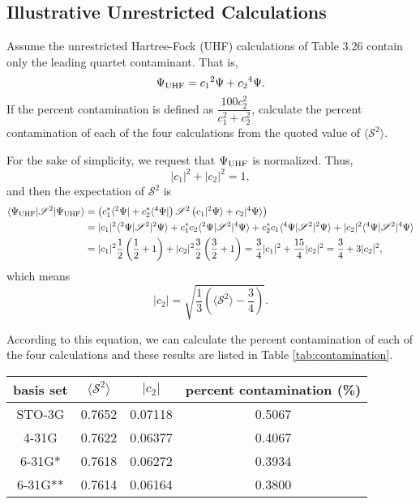 \documentclass[a4paper]{book}
\newcounter{exercise}[chapter]
\newcounter{solution}[chapter]
\newcommand\Tableref[1]{Table \ref{#1}}
\begin{document}
	\subsection{Illustrative Unrestricted Calculations}
	
	\begin{exercise}
	Assume the unrestricted Hartree-Fock (UHF) calculations of Table 3.26 contain only the leading quartet contaminant. That is,
	\[
	 	\Psi_{\rm UHF} = c_1 {}^{2} \Psi + c_2 {}^{4} \Psi .
	\]
	If the percent contamination is defined as $\dfrac{ 100 c^2_2 }{ c^2_1 + c^2_2 }$, calculate the percent contamination of each of the four calculations from the quoted value of $\langle \mathscr{S}^2 \rangle$.
	\end{exercise}
	
	\begin{solution}
	
	For the sake of simplicity, we request that $\Psi_{\rm UHF}$ is normalized. Thus,
	\[
		| c_1 |^2 + | c_2 |^2 = 1 ,
	\]
	and then the expectation of $\mathscr{S}^2$ is
	\begin{align*}
		\langle \Psi_{\rm UHF} | \mathscr{S}^2 | \Psi_{\rm UHF} \rangle &= \left( c^*_1 \langle {}^{2} \Psi | + c^*_2 \langle {}^{4} \Psi | \right) \mathscr{S}^2 \left( c_1 | {}^{2} \Psi \rangle + c_2 | {}^{4} \Psi \rangle \right) \\
		&= | c_1 |^2 \langle {}^{2} \Psi | \mathscr{S}^2 | {}^{2} \Psi \rangle + c^*_1 c_2 \langle {}^{2} \Psi | \mathscr{S}^2 | {}^{4} \Psi \rangle + c^*_2 c_1 \langle {}^{4} \Psi | \mathscr{S}^2 | {}^{2} \Psi \rangle + | c_2 |^2 \langle {}^{4} \Psi | \mathscr{S}^2 | {}^{4} \Psi \rangle \\
		&= | c_1 |^2 \frac{1}{2} \left( \frac{1}{2} + 1 \right) + | c_2 |^2 \frac{3}{2} \left( \frac{3}{2} + 1 \right) = \frac{3}{4} | c_1 |^2 + \frac{15}{4} | c_2 |^2 = \frac{3}{4} + 3 | c_2 |^2 ,
	\end{align*}
	which means
	\[
		| c_2 | =  \sqrt{ \frac{1}{3} \left( \langle \mathscr{S}^2 \rangle - \frac{3}{4} \right) } .
	\]
	
	According to this equation, we can calculate the percent contamination of each of the four calculations and these results are listed in \Tableref{tab:contamination}.
	\vspace{-1em}
	\begin{center}
	\label{tab:contamination}
	\begin{tabular}{c|c|c|c}\hline
	basis set & $\langle \mathscr{S}^2 \rangle$ & $| c_2 |$ & percent contamination (\%) \\ \hline
	STO-3G 	& 0.7652 &  0.07118 & 0.5067 \\
	4-31G  	& 0.7622 &  0.06377	& 0.4067 \\
	6-31G* 	& 0.7618 &	0.06272 & 0.3934 \\
	6-31G** & 0.7614 &  0.06164 & 0.3800 \\ \hline 
	\end{tabular}
	\end{center}
	
	\end{solution}
	
\end{document}
